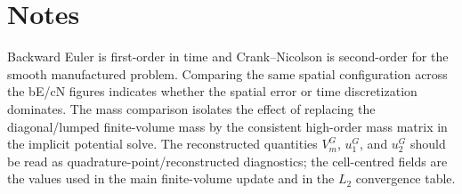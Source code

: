 \documentclass[11pt,a4paper]{article}
\begin{document}
\FloatBarrier
\section{Notes}
Backward Euler is first-order in time and Crank--Nicolson is second-order for the smooth manufactured problem. Comparing the same spatial configuration across the bE/cN figures indicates whether the spatial error or time discretization dominates. The mass comparison isolates the effect of replacing the diagonal/lumped finite-volume mass by the consistent high-order mass matrix in the implicit potential solve. The reconstructed quantities $V_m^G$, $u_1^G$, and $u_2^G$ should be read as quadrature-point/reconstructed diagnostics; the cell-centred fields are the values used in the main finite-volume update and in the $L_2$ convergence table.
\end{document}
